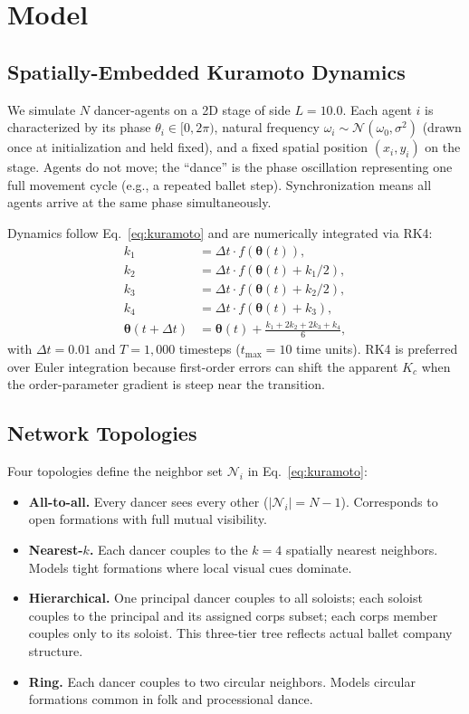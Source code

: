 \documentclass[11pt]{article}
\begin{document}
\section{Model}

\subsection{Spatially-Embedded Kuramoto Dynamics}

We simulate $N$ dancer-agents on a 2D stage of side $L = 10.0$. Each agent $i$ is
characterized by its phase $\theta_i \in [0, 2\pi)$, natural frequency
$\omega_i \sim \mathcal{N}(\omega_0, \sigma^2)$ (drawn once at initialization and held
fixed), and a fixed spatial position $(x_i, y_i)$ on the stage. Agents do not move;
the ``dance'' is the phase oscillation representing one full movement cycle (e.g., a
repeated ballet step). Synchronization means all agents arrive at the same phase
simultaneously.

Dynamics follow Eq.~\eqref{eq:kuramoto} and are numerically integrated via RK4:
\begin{align}
  k_1 &= \Delta t \cdot f(\boldsymbol{\theta}(t)), \\
  k_2 &= \Delta t \cdot f(\boldsymbol{\theta}(t) + k_1/2), \\
  k_3 &= \Delta t \cdot f(\boldsymbol{\theta}(t) + k_2/2), \\
  k_4 &= \Delta t \cdot f(\boldsymbol{\theta}(t) + k_3), \\
  \boldsymbol{\theta}(t + \Delta t) &= \boldsymbol{\theta}(t)
    + \frac{k_1 + 2k_2 + 2k_3 + k_4}{6},
\end{align}
with $\Delta t = 0.01$ and $T = 1{,}000$ timesteps ($t_{\max} = 10$ time units).
RK4 is preferred over Euler integration because first-order errors can shift the
apparent $K_c$ when the order-parameter gradient is steep near the transition.

\subsection{Network Topologies}

Four topologies define the neighbor set $\mathcal{N}_i$ in Eq.~\eqref{eq:kuramoto}:

\begin{itemize}
  \item \textbf{All-to-all.} Every dancer sees every other ($|\mathcal{N}_i| = N - 1$).
    Corresponds to open formations with full mutual visibility.
  \item \textbf{Nearest-$k$.} Each dancer couples to the $k = 4$ spatially nearest
    neighbors. Models tight formations where local visual cues dominate.
  \item \textbf{Hierarchical.} One principal dancer couples to all soloists; each
    soloist couples to the principal and its assigned corps subset; each corps member
    couples only to its soloist. This three-tier tree reflects actual ballet company
    structure.
  \item \textbf{Ring.} Each dancer couples to two circular neighbors. Models circular
    formations common in folk and processional dance.
\end{itemize}
\end{document}
